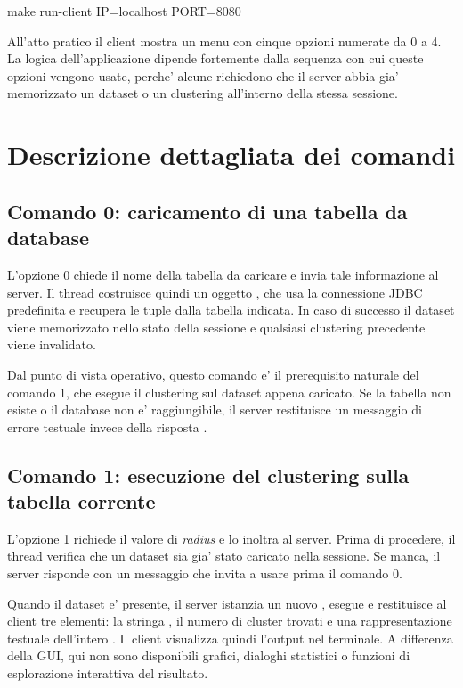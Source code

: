 \begin{commandblock}
  make run-client IP=localhost PORT=8080
\end{commandblock}

All'atto pratico il client mostra un menu con cinque opzioni numerate da 0 a 4. La logica
dell'applicazione dipende fortemente dalla sequenza con cui queste opzioni vengono usate,
perche' alcune richiedono che il server abbia gia' memorizzato un dataset o un clustering
all'interno della stessa sessione.

\section{Descrizione dettagliata dei comandi}

\subsection{Comando 0: caricamento di una tabella da database}

L'opzione 0 chiede il nome della tabella da caricare e invia tale informazione al server.
Il thread  costruisce quindi un oggetto , che usa la connessione JDBC predefinita e recupera le tuple dalla tabella
indicata. In caso di successo il dataset viene memorizzato nello stato della sessione e
qualsiasi clustering precedente viene invalidato.

Dal punto di vista operativo, questo comando e' il prerequisito naturale del comando 1,
che esegue il clustering sul dataset appena caricato. Se la tabella non esiste o il
database non e' raggiungibile, il server restituisce un messaggio di errore testuale
invece della risposta .

\subsection{Comando 1: esecuzione del clustering sulla tabella corrente}

L'opzione 1 richiede il valore di \emph{radius} e lo inoltra al server. Prima di
procedere, il thread verifica che un dataset sia gia' stato caricato nella sessione. Se
manca, il server risponde con un messaggio che invita a usare prima il comando 0.

Quando il dataset e' presente, il server istanzia un nuovo , esegue
 e restituisce al client tre elementi: la stringa , il
numero di cluster trovati e una rappresentazione testuale dell'intero
. Il client visualizza quindi l'output nel terminale. A differenza
della GUI, qui non sono disponibili grafici, dialoghi statistici o funzioni di
esplorazione interattiva del risultato.

